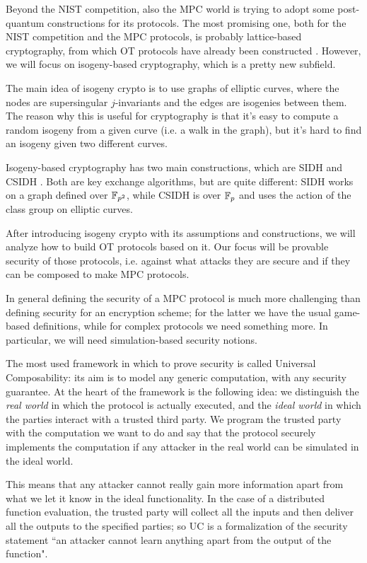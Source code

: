 Beyond the NIST competition, also the MPC world is trying to adopt some post-quantum constructions for its protocols. The most promising one, both for the NIST competition and the MPC protocols, is probably lattice-based cryptography, from which OT protocols have already been constructed \cite{PVW}. However, we will focus on isogeny-based cryptography, which is a pretty new subfield.

The main idea of isogeny crypto is to use graphs of elliptic curves, where the nodes are supersingular $j$-invariants and the edges are isogenies between them. The reason why this is useful for cryptography is that it's easy to compute a random isogeny from a given curve (i.e. a walk in the graph), but it's hard to find an isogeny given two different curves.

Isogeny-based cryptography has two main constructions, which are SIDH \cite{SIDH11} and CSIDH \cite{CSIDH}. Both are key exchange algorithms, but are quite different: SIDH works on a graph defined over $\mathbb{F}_{p^2}$, while CSIDH is over $\mathbb{F}_p$ and uses the action of the class group on elliptic curves.

After introducing isogeny crypto with its assumptions and constructions, we will analyze how to build OT protocols based on it. Our focus will be provable security of those protocols, i.e. against what attacks they are secure and if they can be composed to make MPC protocols.

In general defining the security of a MPC protocol is much more challenging than defining security for an encryption scheme; for the latter we have the usual game-based definitions, while for complex protocols we need something more. In particular, we will need simulation-based security notions.

The most used framework in which to prove security is called Universal Composability: its aim is to model any generic computation, with any security guarantee. At the heart of the framework is the following idea: we distinguish the \emph{real world} in which the protocol is actually executed, and the \emph{ideal world} in which the parties interact with a trusted third party. We program the trusted party with the computation we want to do and say that the protocol securely implements the computation if any attacker in the real world can be simulated in the ideal world.

This means that any attacker cannot really gain more information apart from what we let it know in the ideal functionality. In the case of a distributed function evaluation, the trusted party will collect all the inputs and then deliver all the outputs to the specified parties; so UC is a formalization of the security statement ``an attacker cannot learn anything apart from the output of the function".

